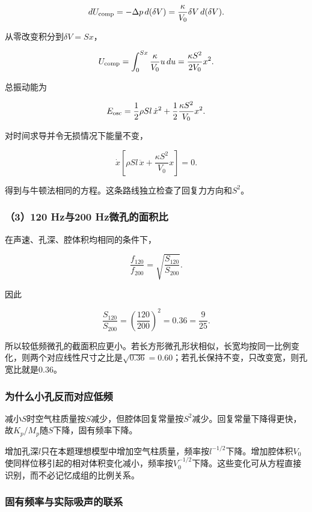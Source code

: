 \documentclass[12pt,a4paper,fontset=fandol]{ctexart}
\begin{document}
\[
dU_{\rm comp}
=-\Delta p\,d(\delta V)
=\frac{\kappa}{V_0}\delta V\,d(\delta V).
\]

从零改变积分到\(\delta V=Sx\)，

\[
U_{\rm comp}=
\int_0^{Sx}\frac{\kappa}{V_0}u\,du
=\frac{\kappa S^2}{2V_0}x^2.
\]

总振动能为

\[
E_{\rm osc}
=\frac12\rho Sl\,\dot x^2
+\frac12\frac{\kappa S^2}{V_0}x^2.
\]

对时间求导并令无损情况下能量不变，

\[
\dot x\left[\rho Sl\,\ddot x+
\frac{\kappa S^2}{V_0}x\right]=0.
\]

得到与牛顿法相同的方程。这条路线独立检查了回复力方向和\(S^2\)。

\subsubsection{（3）120 Hz与200
Hz微孔的面积比}\label{hzux4e0e200-hzux5faeux5b54ux7684ux9762ux79efux6bd4}

在声速、孔深、腔体积均相同的条件下，

\[
\frac{f_{120}}{f_{200}}
=\sqrt{\frac{S_{120}}{S_{200}}}.
\]

因此

\[
\boxed{
\frac{S_{120}}{S_{200}}
=\left(\frac{120}{200}\right)^2
=0.36=\frac9{25}}.
\]

所以较低频微孔的截面积应更小。若长方形微孔形状相似，长宽均按同一比例变化，则两个对应线性尺寸之比是\(\sqrt{0.36}=0.60\)；若孔长保持不变，只改变宽，则孔宽比就是0.36。

\subsubsection{为什么小孔反而对应低频}\label{ux4e3aux4ec0ux4e48ux5c0fux5b54ux53cdux800cux5bf9ux5e94ux4f4eux9891}

减小\(S\)时空气柱质量按\(S\)减少，但腔体回复常量按\(S^2\)减少。回复常量下降得更快，故\(K_p/M_p\)随\(S\)下降，固有频率下降。

增加孔深\(l\)只在本题理想模型中增加空气柱质量，频率按\(l^{-1/2}\)下降。增加腔体积\(V_0\)使同样位移引起的相对体积变化减小，频率按\(V_0^{-1/2}\)下降。这些变化可从方程直接识别，而不必记忆成组的比例关系。

\subsubsection{固有频率与实际吸声的联系}\label{ux56faux6709ux9891ux7387ux4e0eux5b9eux9645ux5438ux58f0ux7684ux8054ux7cfb}
\end{document}
